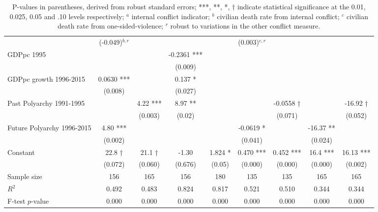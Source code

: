 \begin{landscape}
\begin{table}[!htbp]
\begin{tabular}{lcccccccc}
                               & (-0.049)$^{b,r}$&                 &             &            & (0.003)$^{c,r}$ &             &            & \\
GDPpc 1995                     &                 &                 & -0.2361 *** &            &                 &             &            & \\
                               &                 &                 & (0.009)     &            &                 &             &            & \\
GDPpc growth 1996-2015         & 0.0630 ***      &                 & 0.137 *     &            &                 &             &            & \\
                               & (0.008)         &                 & (0.027)     &            &                 &             &            & \\
Past Polyarchy 1991-1995       &                 & 4.22 ***        & 8.97 **     &            &                 & -0.0558 †   &            & -16.92 † \\
                               &                 & (0.003)         & (0.02)      &            &                 & (0.071)     &            & (0.052) \\
Future Polyarchy 1996-2015     & 4.80 ***        &                 &             &            & -0.0619 *       &             & -16.37 **  & \\
                               & (0.002)         &                 &             &            & (0.041)         &             & (0.024)    & \\
Constant                       & 22.8 †          & 21.1 †          & -1.30       & 1.824 *    & 0.470 ***       & 0.452 ***   & 16.4 ***   & 16.13 *** \\
                               & (0.072)         & (0.060)         & (0.676)     & (0.05)     & (0.000)         & (0.000)     & (0.000)    & (0.002) \\
\midrule
Sample size                    & 156             & 165             & 156         & 180        & 135             & 135         & 165        & 165 \\
$R^2$                          & 0.492           & 0.483           & 0.824       & 0.817      & 0.521           & 0.510       & 0.344      & 0.344 \\
F-test $p$-value               & 0.000           & 0.000           & 0.000       & 0.000      & 0.000           & 0.000       & 0.000      & 0.000 \\
\bottomrule
\end{tabular}
\caption*{P-values in parentheses, derived from robust standard errors; ***, **, *, † indicate statistical significance at the 0.01, 0.025, 0.05 and .10 levels respectively; $^a$ internal conflict indicator; $^b$ civilian death rate from internal conflict; $^c$ civilian death rate from one-sided-violence; $^r$ robust to variations in the other conflict measure.}
\end{table}
\end{landscape}

